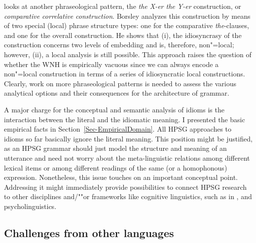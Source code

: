 \documentclass[output=paper
                ,modfonts
                ,nonflat
	        ,collection
	        ,collectionchapter
	        ,collectiontoclongg
 	        ,biblatex
                ,babelshorthands
                ,newtxmath
                ,draftmode
                ,colorlinks, citecolor=brown
]{./langsci/langscibook}
\begin{document}
\citet{Borsley2004a} looks at another phraseological pattern, the \emph{the X-er the Y-er} construction, or \emph{comparative correlative construction}.
Borsley analyzes this construction by means of two special (local) phrase structure types: one for the comparative \emph{the}-clauses, and one for the overall construction. He shows that (i), the idiosyncrasy of the construction concerns two levels of embedding and is, therefore, non"=local; however, (ii),
a local analysis is still possible. This approach raises the question of whether the WNH is empirically vacuous since we can always encode a non"=local construction in terms of a series of idiosyncratic local constructions. 
Clearly, work on more phraseological patterns is needed to assess the various analytical options and their consequences for the architecture of grammar.


A major charge for the conceptual and semantic analysis of idioms is the interaction between the literal and the idiomatic meaning. 
I presented the basic empirical facts in Section~\ref{Sec-EmpiricalDomain}. 
All HPSG approaches to idioms so far basically ignore the literal meaning.
This position might be justified, as  an HPSG grammar should just model the structure and meaning of an utterance and need not worry about the meta-linguistic relations among different lexical items or among different readings of the same (or a homophonous) expression.
Nonetheless, this issue touches on an important conceptual point. 
Addressing it might immediately provide possibilities to connect HPSG research to other disciplines and/""or frameworks like cognitive linguistics, such as in \citet{Dobrovolskij:Piirainen:05}, and psycholinguistics.




\subsection{Challenges from other languages}
\label{Sec-OtherLanguages}
\end{document}
